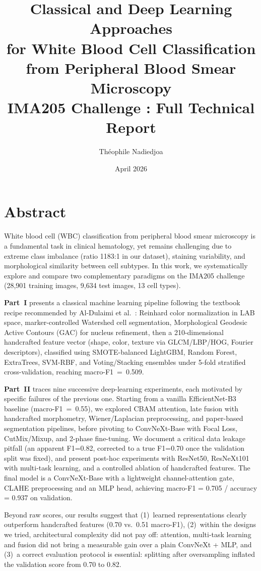 \documentclass[twocolumn,a4paper]{article}
\title{Classical and Deep Learning Approaches\\for White Blood Cell Classification\\from Peripheral Blood Smear Microscopy\\[0.5em]\large IMA205 Challenge : Full Technical Report}
\author{Th\'eophile Nadiedjoa}
\date{April 2026}
\begin{document}
\maketitle

\section*{Abstract}

White blood cell (WBC) classification from peripheral blood smear microscopy is a fundamental task in clinical hematology, yet remains challenging due to extreme class imbalance (ratio 1183:1 in our dataset), staining variability, and morphological similarity between cell subtypes. In this work, we systematically explore and compare two complementary paradigms on the IMA205 challenge (28,901 training images, 9,634 test images, 13 cell types).

\textbf{Part~I} presents a classical machine learning pipeline following the textbook recipe recommended by Al-Dulaimi et al.~\cite{aldulaimi2018}: Reinhard color normalization in LAB space, marker-controlled Watershed cell segmentation, Morphological Geodesic Active Contours (GAC) for nucleus refinement, then a 210-dimensional handcrafted feature vector (shape, color, texture via GLCM/LBP/HOG, Fourier descriptors), classified using SMOTE-balanced LightGBM, Random Forest, ExtraTrees, SVM-RBF, and Voting/Stacking ensembles under 5-fold stratified cross-validation, reaching macro-F1~=~0.509.

\textbf{Part~II} traces nine successive deep-learning experiments, each motivated by specific failures of the previous one. Starting from a vanilla EfficientNet-B3 baseline (macro-F1~=~0.55), we explored CBAM attention, late fusion with handcrafted morphometry, Wiener/Laplacian preprocessing, and paper-based segmentation pipelines, before pivoting to ConvNeXt-Base with Focal Loss, CutMix/Mixup, and 2-phase fine-tuning. We document a critical data leakage pitfall (an apparent F1=0.82, corrected to a true F1=0.70 once the validation split was fixed), and present post-hoc experiments with ResNet50, ResNeXt101 with multi-task learning, and a controlled ablation of handcrafted features. The final model is a ConvNeXt-Base with a lightweight channel-attention gate, CLAHE preprocessing and an MLP head, achieving macro-F1 = 0.705 / accuracy = 0.937 on validation.

Beyond raw scores, our results suggest that (1)~learned representations clearly outperform handcrafted features (0.70 vs.\ 0.51 macro-F1), (2)~within the designs we tried, architectural complexity did not pay off: attention, multi-task learning and fusion did not bring a measurable gain over a plain ConvNeXt + MLP, and (3)~a correct evaluation protocol is essential: splitting after oversampling inflated the validation score from 0.70 to 0.82.
\end{document}
